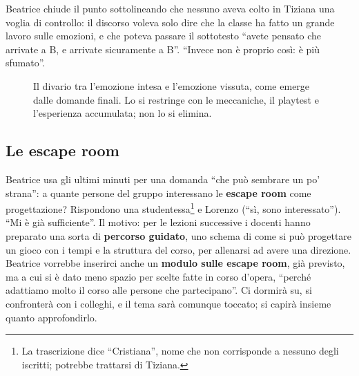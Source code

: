Beatrice chiude il punto sottolineando che nessuno aveva colto in Tiziana una voglia di
controllo: il discorso voleva solo dire che la classe ha fatto un grande lavoro sulle
emozioni, e che poteva passare il sottotesto ``avete pensato che arrivate a B, e
arrivate sicuramente a B''. ``Invece non è proprio così: è più sfumato''.

\begin{figure}[htbp]
\centering
{}
\caption{Il divario tra l'emozione intesa e l'emozione vissuta, come emerge dalle
domande finali. Lo si restringe con le meccaniche, il playtest e l'esperienza
accumulata; non lo si elimina.}
\label{a6:fig:gap}
\end{figure}

\subsection{Le escape room}
\label{a6:sec:escape}

Beatrice usa gli ultimi minuti per una domanda ``che può sembrare un po' strana'': a
quante persone del gruppo interessano le \textbf{escape room} come progettazione?
Rispondono una studentessa\footnote{La trascrizione dice ``Cristiana'', nome che non
corrisponde a nessuno degli iscritti; potrebbe trattarsi di Tiziana.} e Lorenzo
(``sì, sono interessato''). ``Mi è già sufficiente''. Il motivo: per le lezioni
successive i docenti hanno preparato una sorta di \textbf{percorso guidato}, uno schema
di come si può progettare un gioco con i tempi e la struttura del corso, per allenarsi
ad avere una direzione. Beatrice vorrebbe inserirci anche un \textbf{modulo sulle
escape room}, già previsto, ma a cui si è dato meno spazio per scelte fatte in corso
d'opera, ``perché adattiamo molto il corso alle persone che partecipano''. Ci dormirà
su, si confronterà con i colleghi, e il tema sarà comunque toccato; si capirà insieme
quanto approfondirlo.

